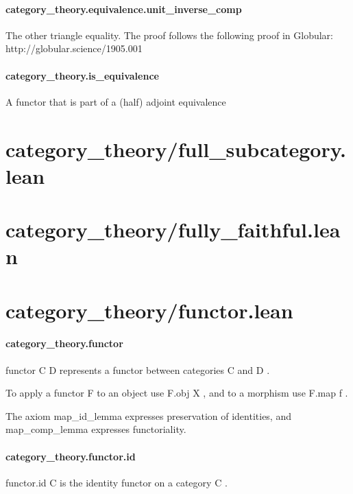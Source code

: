 \documentclass{article}
\begin{document}
\paragraph{category\_theory.equivalence.unit\_inverse\_comp}
\par
The other triangle equality. The proof follows the following proof in Globular:
http://globular.science/1905.001
\paragraph{category\_theory.is\_equivalence}
\par
A functor that is part of a (half) adjoint equivalence
\section{category\_theory/full\_subcategory.lean}\section{category\_theory/fully\_faithful.lean}\section{category\_theory/functor.lean}\paragraph{category\_theory.functor}
\par
\colorbox[RGB]{253,246,227}{{{{\color[RGB]{101, 123, 131} functor C D }}}} represents a functor between categories 
\colorbox[RGB]{253,246,227}{{{{\color[RGB]{101, 123, 131} C }}}} and 
\colorbox[RGB]{253,246,227}{{{{\color[RGB]{101, 123, 131} D }}}}.
\par
To apply a functor 
\colorbox[RGB]{253,246,227}{{{{\color[RGB]{101, 123, 131} F }}}} to an object use 
\colorbox[RGB]{253,246,227}{{{{\color[RGB]{101, 123, 131} F.obj X }}}}, and to a morphism use 
\colorbox[RGB]{253,246,227}{{{{\color[RGB]{101, 123, 131} F.map f }}}}.
\par
The axiom 
\colorbox[RGB]{253,246,227}{{{{\color[RGB]{101, 123, 131} map\_id\_lemma }}}} expresses preservation of identities, and
\colorbox[RGB]{253,246,227}{{{{\color[RGB]{101, 123, 131} map\_comp\_lemma }}}} expresses functoriality.
\paragraph{category\_theory.functor.id}
\par
\colorbox[RGB]{253,246,227}{{{{\color[RGB]{101, 123, 131} functor.id C }}}} is the identity functor on a category 
\colorbox[RGB]{253,246,227}{{{{\color[RGB]{101, 123, 131} C }}}}.
\end{document}

